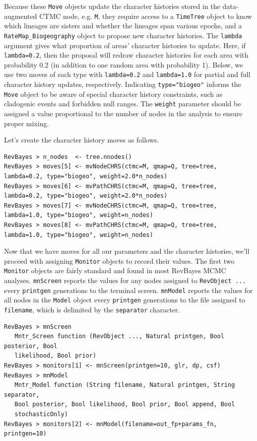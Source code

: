Because these {\tt Move} objects update the character histories stored in the data-augmented CTMC node, e.g. {\tt M},
they require access to a {\tt TimeTree} object to know which lineages are sisters and whether the lineages span various epochs, and a {\tt RateMap\_Biogeography} object to propose new character histories.
The {\tt lambda} argument gives what proportion of areas' character histories to update.
Here, if {\tt lambda=0.2}, then the proposal will redraw character histories for each area with probability 0.2 (in addition to one random area with probability 1).
Below, we use two moves of each type with {\tt lambda=0.2} and {\tt lambda=1.0} for partial and full character history updates, respectively.
Indicating {\tt type="biogeo"} informs the {\tt Move} object to be aware of special character history constraints, such as cladogenic events and forbidden null ranges.
The {\tt weight} parameter should be assigned a value proportional to the number of nodes in the analysis to ensure proper mixing.

Let's create the character history moves as follows.

\begin{snugshade}
\begin{lstlisting}
RevBayes > n_nodes  <- tree.nnodes()
RevBayes > moves[5] <- mvNodeCHRS(ctmc=M, qmap=Q, tree=tree, lambda=0.2, type="biogeo", weight=2.0*n_nodes)
RevBayes > moves[6] <- mvPathCHRS(ctmc=M, qmap=Q, tree=tree, lambda=0.2, type="biogeo", weight=2.0*n_nodes)
RevBayes > moves[7] <- mvNodeCHRS(ctmc=M, qmap=Q, tree=tree, lambda=1.0, type="biogeo", weight=n_nodes)
RevBayes > moves[8] <- mvPathCHRS(ctmc=M, qmap=Q, tree=tree, lambda=1.0, type="biogeo", weight=n_nodes)
\end{lstlisting}
\end{snugshade}

Now that we have moves for all our parameters and the character histories, we'll proceed with assigning {\tt Monitor} objects to record their values.
The first two {\tt Monitor} objects are fairly standard and found in most RevBayes MCMC analyses.
{\tt mnScreen} reports the values for any nodes assigned to {\tt RevObject ...} every {\tt printgen} generations to the terminal screen.
{\tt mnModel} reports the values for all nodes in the {\tt Model} object every {\tt printgen} generations to the file assigned to {\tt filename}, which is delimited by the {\tt separator} character.

\begin{snugshade}
\begin{lstlisting}
RevBayes > mnScreen
   Mntr_Screen function (RevObject ..., Natural printgen, Bool posterior, Bool
   likelihood, Bool prior)
RevBayes > monitors[1] <- mnScreen(printgen=10, glr, dp, csf)
RevBayes > mnModel
   Mntr_Model function (String filename, Natural printgen, String separator,
   Bool posterior, Bool likelihood, Bool prior, Bool append, Bool
   stochasticOnly)
RevBayes > monitors[2] <- mnModel(filename=out_fp+params_fn, printgen=10)
\end{lstlisting}
\end{snugshade}

